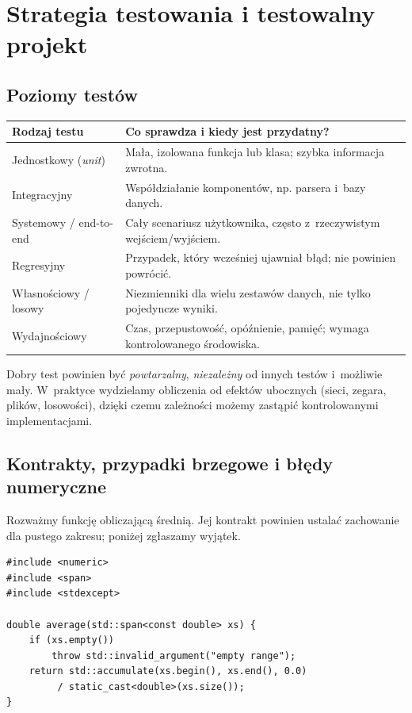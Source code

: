 \section{Strategia testowania i testowalny projekt}
\label{sec:cpp18-strategy}

\subsection{Poziomy testów}

\begin{center}
\small
\begin{tabularx}{\textwidth}{@{}p{}X@{}}
\toprule
Rodzaj testu & Co sprawdza i kiedy jest przydatny?\\
\midrule
Jednostkowy (\emph{unit}) & Mała, izolowana funkcja lub klasa; szybka informacja zwrotna.\\
Integracyjny & Współdziałanie komponentów, np. parsera i~bazy danych.\\
Systemowy / end-to-end & Cały scenariusz użytkownika, często z~rzeczywistym wejściem/wyjściem.\\
Regresyjny & Przypadek, który wcześniej ujawniał błąd; nie powinien powrócić.\\
Własnościowy / losowy & Niezmienniki dla wielu zestawów danych, nie tylko pojedyncze wyniki.\\
Wydajnościowy & Czas, przepustowość, opóźnienie, pamięć; wymaga kontrolowanego środowiska.\\
\bottomrule
\end{tabularx}
\end{center}

Dobry test powinien być \emph{powtarzalny}, \emph{niezależny} od innych
testów i~możliwie mały. W~praktyce wydzielamy obliczenia od efektów
ubocznych (sieci, zegara, plików, losowości), dzięki czemu zależności
możemy zastąpić kontrolowanymi implementacjami.

\subsection{Kontrakty, przypadki brzegowe i błędy numeryczne}

Rozważmy funkcję obliczającą średnią. Jej kontrakt powinien ustalać
zachowanie dla pustego zakresu; poniżej zgłaszamy wyjątek.

\begin{lstlisting}[caption={Prosta funkcja z jawnym kontraktem dla pustego zakresu (C++20).}]
#include <numeric>
#include <span>
#include <stdexcept>

double average(std::span<const double> xs) {
    if (xs.empty())
        throw std::invalid_argument("empty range");
    return std::accumulate(xs.begin(), xs.end(), 0.0)
         / static_cast<double>(xs.size());
}
\end{lstlisting}

